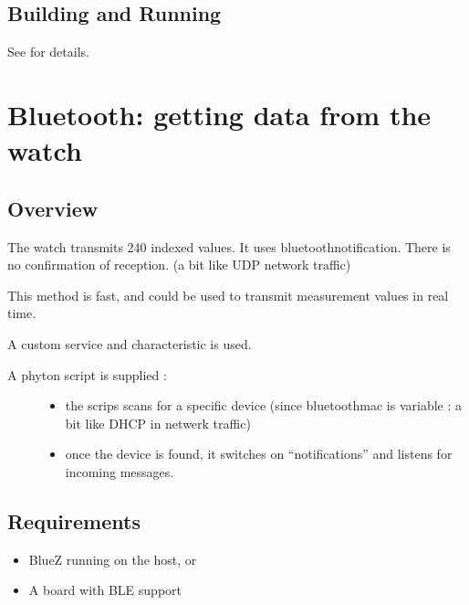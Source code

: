 \documentclass[letterpaper,10pt,english]{sphinxmanual}
\begin{document}
\subsection{Building and Running}
\label{\detokenize{samples/samplesbluetoothperipheral-getparamREADME:building-and-running}}
See  for details.


\section{Bluetooth: getting data from the watch}
\label{\detokenize{samples/samplesbluetoothperipheral-notificationREADME:bluetooth-getting-data-from-the-watch}}\label{\detokenize{samples/samplesbluetoothperipheral-notificationREADME:ble-peripheral}}\label{\detokenize{samples/samplesbluetoothperipheral-notificationREADME::doc}}

\subsection{Overview}
\label{\detokenize{samples/samplesbluetoothperipheral-notificationREADME:overview}}
The watch transmits 240 indexed values.
It uses bluetoothnotification.
There is no confirmation of reception. (a bit like UDP network traffic)

This method is fast, and could be used to transmit measurement values in real time.

A custom service and characteristic is used.
\begin{description}
\item[{A phyton script is supplied :}] \leavevmode\begin{itemize}
\item {} 
the scrips scans for a specific device (since bluetoothmac is variable : a bit like DHCP in netwerk traffic)

\item {} 
once the device is found, it switches on “notifications” and listens for incoming messages.

\end{itemize}

\end{description}


\subsection{Requirements}
\label{\detokenize{samples/samplesbluetoothperipheral-notificationREADME:requirements}}\begin{itemize}
\item {} 
BlueZ running on the host, or

\item {} 
A board with BLE support

\end{itemize}
\end{document}

